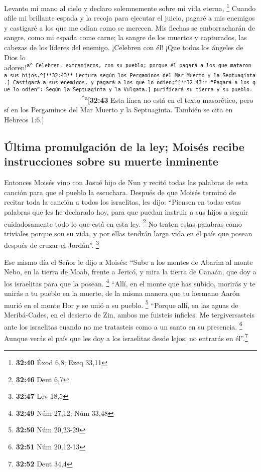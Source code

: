 Levanto mi mano al cielo y declaro solemnemente sobre mi
vida eterna, \footnote{\textbf{32:40} Éxod 6,8; Ezeq 33,11}
 Cuando afile mi brillante espada y la recoja para
ejecutar el juicio, pagaré a mis enemigos y castigaré a los que me odian
como se merecen.  Mis flechas se emborracharán de sangre,
como mi espada come carne; la sangre de los muertos y capturados, las
cabezas de los líderes del enemigo.  ¡Celebren con él!
¡Que todos los ángeles de Dios lo
adoren!\textsuperscript{\texttt{a\^{}\ Celebren,\ extranjeros,\ con\ su\ pueblo;\ porque\ él\ pagará\ a\ los\ que\ mataron\ a\ sus\ hijos.\^{}{[}**32:43**\ Lectura\ según\ los\ Pergaminos\ del\ Mar\ Muerto\ y\ la\ Septuaginta.{]}\ Castigará\ a\ sus\ enemigos,\ y\ pagará\ a\ los\ que\ lo\ odien;\^{}{[}**32:43**\ “Pagará\ a\ los\ que\ lo\ odien”:\ Según\ la\ Septuaginta\ y\ la\ Vulgata.{]}\ purificará\ su\ tierra\ y\ su\ pueblo.\ \ \ \ \ \ \ \ \ \ \ \ \ \ \ \ \ \ \ \ \ \ \ \ \ \ \ \^{}}a}{[}\textbf{32:43}
Esta línea no está en el texto masorético, pero sí en los Pergaminos del
Mar Muerto y la Septuaginta. También se cita en Hebreos 1:6.{]}

\hypertarget{uxfaltima-promulgaciuxf3n-de-la-ley-moisuxe9s-recibe-instrucciones-sobre-su-muerte-inminente}{%
\subsection{Última promulgación de la ley; Moisés recibe instrucciones
sobre su muerte
inminente}\label{uxfaltima-promulgaciuxf3n-de-la-ley-moisuxe9s-recibe-instrucciones-sobre-su-muerte-inminente}}

 Entonces Moisés vino con Josué hijo de Nun y recitó
todas las palabras de esta canción para que el pueblo la escuchara.
 Después de que Moisés terminó de recitar toda la canción
a todos los israelitas,  les dijo: ``Piensen en todas
estas palabras que les he declarado hoy, para que puedan instruir a sus
hijos a seguir cuidadosamente todo lo que está en esta ley. \footnote{\textbf{32:46}
  Deut 6,7}  No traten estas palabras como triviales
porque son su vida, y por ellas tendrán larga vida en el país que posean
después de cruzar el Jordán''. \footnote{\textbf{32:47} Lev 18,5}

 Ese mismo día el Señor le dijo a Moisés: 
``Sube a los montes de Abarim al monte Nebo, en la tierra de Moab,
frente a Jericó, y mira la tierra de Canaán, que doy a los israelitas
para que la posean. \footnote{\textbf{32:49} Núm 27,12; Núm 33,48}
 ``Allí, en el monte que has subido, morirás y te unirás
a tu pueblo en la muerte, de la misma manera que tu hermano Aarón murió
en el monte Hor y se unió a su pueblo. \footnote{\textbf{32:50} Núm
  20,23-29}  ``Porque allí, en las aguas de Meribá-Cades,
en el desierto de Zin, ambos me fuisteis infieles. Me tergiversasteis
ante los israelitas cuando no me tratasteis como a un santo en su
presencia. \footnote{\textbf{32:51} Núm 20,12-13}  Aunque
verás el país que les doy a los israelitas desde lejos, no entrarás en
él''.\footnote{\textbf{32:52} Deut 34,4}

